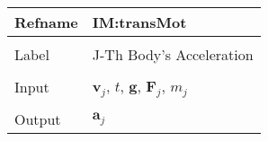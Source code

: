 \documentclass[12pt]{article}
\begin{document}
\vspace{\baselineskip}
\noindent
\begin{minipage}{\textwidth}
\begin{tabular}{>{\raggedright}p{}>{\raggedright\arraybackslash}p{}}
\toprule \textbf{Refname} & \textbf{IM:transMot}
\label{IM:transMot}
\\ \midrule \\
Label & J-Th Body's Acceleration
        
\\ \midrule \\
Input & ${\symbf{v}_{j}}$, $t$, $\symbf{g}$, ${\symbf{F}_{j}}$, ${m_{j}}$
        
\\ \midrule \\
Output & ${\symbf{a}_{j}}$
         

\end{tabular}
\end{minipage}
\end{document}
